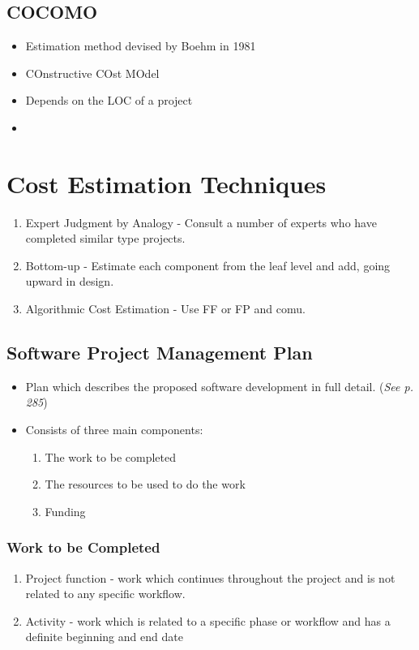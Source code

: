 \documentclass{report}
\begin{document}
			\subsection{COCOMO}
				\begin{itemize}
					\item Estimation method devised by Boehm in 1981
					\item COnstructive COst MOdel
					\item Depends on the LOC of a project
					\item 
				\end{itemize}
		\section{Cost Estimation Techniques}
			\begin{enumerate}
				\item Expert Judgment by Analogy - Consult a number of experts who have completed similar type projects.
				\item Bottom-up - Estimate each component from the leaf level and add, going upward in design.
				\item Algorithmic Cost Estimation - Use FF or FP and comu.
			\end{enumerate}
			\subsection{Software Project Management Plan}
				\begin{itemize}
					\item Plan which describes the proposed software development in full detail. (\textit{See p. 285})
					\item Consists of three main components:
					\begin{enumerate}
						\item The work to be completed
						\item The resources to be used to do the work
						\item Funding
					\end{enumerate}
				\end{itemize}
				\subsubsection{Work to be Completed}
					\begin{enumerate}
						\item Project function - work which continues throughout the project and is not related to any specific workflow.
						\item Activity - work which is related to a specific phase or workflow and has a definite beginning and end date
					\end{enumerate}
\end{document}
